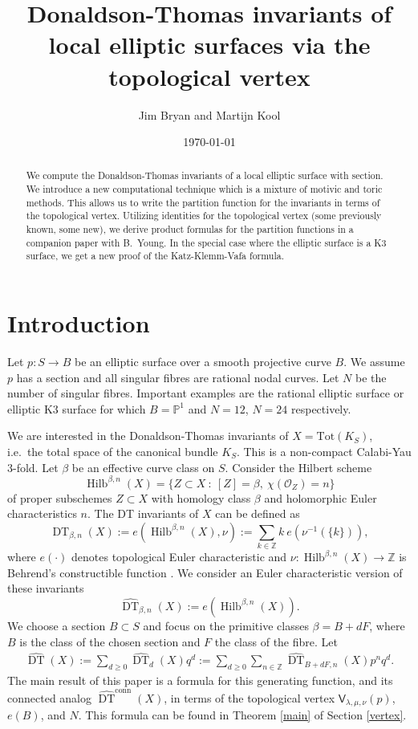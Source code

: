 \documentclass{amsart}
\title[DT invariants of local elliptic surfaces]{Donaldson-Thomas invariants of local elliptic surfaces via the topological vertex}
\author{Jim Bryan and Martijn Kool}
\date{\today}
\theoremstyle{definition}
\newcommand{\ZZ} {\mathbb{Z}}		%
\newcommand{\PP} {\mathbb{P}}
\renewcommand{\O}{\mathcal{O}}
\newcommand{\sfV}{\mathsf{V}}
\newcommand{\Hilb}{\operatorname{Hilb}}
\newcommand{\DT}{\operatorname{DT}}
\newcommand{\conn}{\operatorname{conn}}
\begin{document}
\begin{abstract}

We compute the Donaldson-Thomas invariants of a local elliptic surface
with section. We introduce a new computational technique which is a
mixture of motivic and toric methods. This allows us to write the
partition function for the invariants in terms of the topological
vertex. Utilizing identities for the topological vertex (some
previously known, some new), we derive product formulas for the
partition functions in a companion paper with B.~Young. In the special case where the elliptic surface is
a K3 surface, we get a new proof of the Katz-Klemm-Vafa formula.
\end{abstract}

\maketitle 





\section{Introduction}

Let $p : S \rightarrow B$ be an elliptic surface over a smooth projective curve $B$. We assume $p$ has a section and all singular fibres are rational nodal curves. Let $N$ be the number of singular fibres. Important examples are the rational elliptic surface or elliptic K3 surface for which $B = \PP^1$ and $N = 12$, $N=24$ respectively.

We are interested in the Donaldson-Thomas invariants of $X = \mathrm{Tot}(K_S)$, i.e.~the total space of the canonical bundle $K_S$. This is a non-compact Calabi-Yau 3-fold. Let $\beta$ be an effective curve class on $S$. Consider the Hilbert scheme 
$$
\Hilb^{\beta,n}(X) = \{ Z \subset X \ : \ [Z] = \beta, \ \chi(\O_Z) = n\}
$$
of proper subschemes $Z \subset X$ with homology class $\beta$ and holomorphic Euler characteristics $n$. The DT invariants of $X$ can be defined as
$$
\DT_{\beta,n}(X) := e(\Hilb^{\beta,n}(X), \nu) := \sum_{k \in \ZZ} k \ e(\nu^{-1}(\{k\})),
$$
where $e(\cdot)$ denotes topological Euler characteristic and $\nu : \Hilb^{\beta,n}(X) \rightarrow \ZZ$ is Behrend's constructible function \cite{Beh}. We consider an Euler characteristic version of these invariants
$$
\widehat{\DT}_{\beta,n}(X) := e(\Hilb^{\beta,n}(X)).
$$
We choose a section $B \subset S$ and focus on the primitive classes $\beta = B + dF$, where $B$ is the class of the chosen section and $F$ the class of the fibre. Let 
\begin{align*}
\widehat{\DT}(X) := \sum_{d \geq 0} \widehat{\DT}_d(X) q^d := \sum_{d \geq 0} \sum_{n \in \ZZ} \widehat{\DT}_{B+dF,n}(X) p^n q^d.
\end{align*}
The main result of this paper is a formula for this generating function, and its connected analog $\widehat{\DT}^{\conn}(X)$, in terms of the topological vertex $\sfV_{\lambda,\mu,\nu}(p)$, $e(B)$, and $N$. This formula can be found in Theorem \ref{main} of Section \ref{vertex}.
\end{document}
